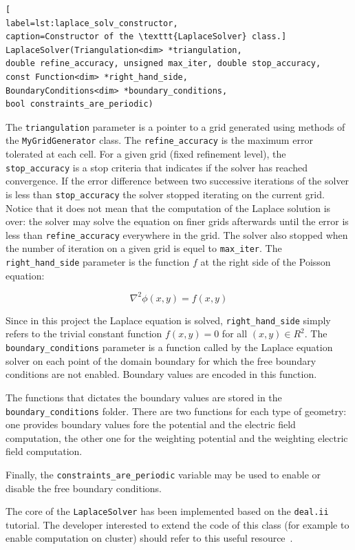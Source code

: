\documentclass[11pt]{article}
\begin{document}
		\begin{lstlisting}[
label=lst:laplace_solv_constructor,
caption=Constructor of the \texttt{LaplaceSolver} class.]
LaplaceSolver(Triangulation<dim> *triangulation,
double refine_accuracy, unsigned max_iter, double stop_accuracy,
const Function<dim> *right_hand_side,
BoundaryConditions<dim> *boundary_conditions,
bool constraints_are_periodic)
		\end{lstlisting}

		The \texttt{triangulation} parameter is a pointer to a grid generated using methods of
		the \texttt{MyGridGenerator} class. The \texttt{refine\_accuracy} is the maximum
		error tolerated at each cell. For a given grid (fixed refinement level),
		the \texttt{stop\_accuracy}  is a stop criteria that indicates if the solver has
		reached convergence. If the error difference between two successive iterations
		of the solver is less than \texttt{stop\_accuracy} the solver stopped iterating
		on the current grid. Notice that it does not mean that the computation of the
		Laplace solution is over: the solver may solve the equation on finer grids
		afterwards until the error is less than \texttt{refine\_accuracy} everywhere
		in the grid. The solver also stopped when the number of iteration on a given
		grid is equel to \texttt{max\_iter}. The \texttt{right\_hand\_side} parameter
		is the function $f$ at the right side of the Poisson equation:

		\[\nabla^2 \phi(x,y) = f(x,y)\]

		Since in this project the Laplace equation is solved, \texttt{right\_hand\_side}
		simply refers to the trivial constant function $f(x,y) = 0$ for all $(x,y) \in R^2$.
		The \texttt{boundary\_conditions} parameter is a function called by the Laplace
		equation solver on each point of the domain boundary for which the free
		boundary conditions are not enabled. Boundary values are encoded in this function.

		The functions that dictates the boundary values are stored in the
		\texttt{boundary\_conditions} folder. There are two functions for each
		type of geometry: one provides boundary values fore the potential and the electric
		field computation, the other one for the weighting potential and the weighting
		electric field computation.

		Finally, the \texttt{constraints\_are\_periodic} variable may be used to
		enable or disable the free boundary conditions.

		The core of the \texttt{LaplaceSolver} has been implemented based on the
		\texttt{deal.ii} tutorial. The developer interested to extend the code of this
		class (for example to enable computation on cluster) should refer to this
		useful resource~\cite{deal.iituto}.
\end{document}
